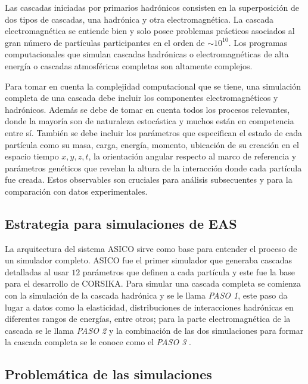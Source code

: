 Las cascadas iniciadas por primarios hadrónicos consisten en la superposición de dos tipos de cascadas, una hadrónica y otra electromagnética. La cascada electromagnética se entiende bien y solo posee problemas prácticos asociados al gran número de partículas participantes en el orden de $\sim 10^{10}$. Los programas computacionales que simulan cascadas hadrónicas o electromagnéticas de alta energía o cascadas atmosféricas completas son altamente complejos.

Para tomar en cuenta la complejidad computacional que se tiene, una simulación completa de una cascada debe incluir los componentes electromagnéticos y hadrónicos. Además se debe de tomar en cuenta todos los procesos relevantes, donde la mayoría son de naturaleza estocástica y muchos están en competencia entre sí. También se debe incluir los parámetros que especifican el estado de cada partícula como su masa, carga, energía, momento, ubicación de su creación en el espacio tiempo $x,y,z,t$, la orientación angular respecto al marco de referencia y parámetros genéticos que revelan la altura de la interacción donde cada partícula fue creada. Estos observables son cruciales para análisis subsecuentes y para la comparación con datos experimentales.

\subsection{Estrategia para simulaciones de EAS}

La arquitectura del sistema ASICO sirve como base para entender el proceso de un simulador completo. ASICO fue el primer simulador que generaba cascadas detalladas al usar $12$ parámetros que definen a cada partícula y este fue la base para el desarrollo de CORSIKA.
Para simular una cascada completa se comienza con la simulación de la cascada hadrónica y se le llama \textit{PASO 1}, este paso da lugar a datos como la elasticidad, distribuciones de interacciones hadrónicas en diferentes rangos de energías, entre otros; para la parte electromagnética de la cascada se le llama \textit{PASO 2} y la combinación de las dos simulaciones para formar la cascada completa se le conoce como el \textit{PASO 3} \parencite{GriederEAS2010}.



\subsection{Problemática de las simulaciones}


